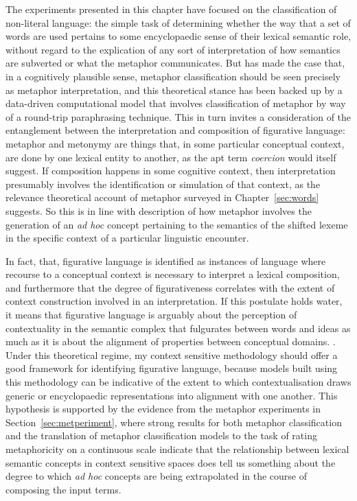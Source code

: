 The experiments presented in this chapter have focused on the classification of non-literal language: the simple task of determining whether the way that a set of words are used pertains to some encyclopaedic sense of their lexical semantic role, without regard to the explication of any sort of interpretation of how semantics are subverted or what the metaphor communicates.  But \cite{Shutova2010} has made the case that, in a cognitively plausible sense, metaphor classification should be seen precisely as metaphor interpretation, and this theoretical stance has been backed up by a data-driven computational model that involves classification of metaphor by way of a round-trip paraphrasing technique.  This in turn invites a consideration of the entanglement between the interpretation and composition of figurative language: metaphor and metonymy are things that, in some particular conceptual context, are done by one lexical entity to another, as the apt term \emph{coercion} would itself suggest.  If composition happens in some cognitive context, then interpretation presumably involves the identification or simulation of that context, as the relevance theoretical account of metaphor surveyed in Chapter~\ref{sec:words} suggests.  So this is in line with  description of how metaphor involves the generation of an \emph{ad hoc} concept pertaining to the semantics of the shifted lexeme in the specific context of a particular linguistic encounter.

In fact,   that,  figurative language is identified   as  instances of language where recourse to a conceptual context is necessary to interpret a lexical composition, and furthermore that the degree of figurativeness correlates with the extent of context construction involved in an interpretation.  If this postulate holds water, it means that figurative language is arguably about the perception of contextuality in the semantic complex that fulgurates between words and ideas as much as it is about the alignment of properties between conceptual domains.   \citep{ArzouanEA2007}.  Under this theoretical regime, my context sensitive methodology should offer a good framework for identifying figurative language, because models built using this methodology can be indicative of the extent to which contextualisation draws generic or encyclopaedic representations into alignment with one another.  This hypothesis is supported by the evidence from the metaphor experiments in Section~\ref{sec:metperiment}, where strong results for both metaphor classification and the translation of metaphor classification models to the task of rating metaphoricity on a continuous scale indicate that the relationship between lexical semantic concepts in context sensitive spaces does tell us something about the degree to which \emph{ad hoc} concepts are being extrapolated in the course of composing the input terms.

